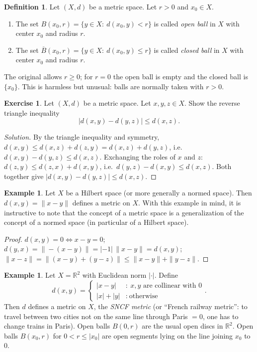 \documentclass[11pt,a4paper]{article}
\numberwithin{equation}{section}
\newcommand{\R}{\mathbb{R}}
\newcommand{\conj}[1]{\overline{#1}}
\theoremstyle{plain}
\theoremstyle{definition}
\newtheorem{definition}[theorem]{Definition}
\newtheorem{example}[theorem]{Example}
\newtheorem{exercise}[theorem]{Exercise}
\theoremstyle{plain}
\theoremstyle{definition}
\newenvironment{solution}{\begin{proof}[Solution]}{\end{proof}}
\begin{document}
\begin{definition}
Let $(X,d)$ be a metric space. Let $r>0$ and $x_0\in X$.
\begin{enumerate}
\item The set $B(x_0,r)=\{y\in X:\ d(x_0,y)<r\}$ is called \emph{open ball} in $X$ with
center $x_0$ and radius $r$.
\item The set $\conj B(x_0,r)=\{y\in X:\ d(x_0,y)\le r\}$ is called \emph{closed ball} in
$X$ with center $x_0$ and radius $r$.
\end{enumerate}
\end{definition}
\begin{correction}[(Def.~7.2)]
The original allows $r\ge0$; for $r=0$ the open ball is empty and the closed ball is
$\{x_0\}$. This is harmless but unusual: balls are normally taken with $r>0$.
\end{correction}

\begin{exercise}
Let $(X,d)$ be a metric space. Let $x,y,z\in X$. Show the reverse triangle inequality
\[
|d(x,y)-d(y,z)|\le d(x,z).
\]
\end{exercise}
\begin{solution}
By the triangle inequality and symmetry, $d(x,y)\le d(x,z)+d(z,y)=d(x,z)+d(y,z)$, i.e.\
$d(x,y)-d(y,z)\le d(x,z)$. Exchanging the roles of $x$ and $z$:
$d(z,y)\le d(z,x)+d(x,y)$, i.e.\ $d(y,z)-d(x,y)\le d(x,z)$. Both together give
$|d(x,y)-d(y,z)|\le d(x,z)$.
\end{solution}

\begin{example}
Let $X$ be a Hilbert space (or more generally a normed space). Then $d(x,y)=\|x-y\|$ defines
a metric on $X$. With this example in mind, it is instructive to note that the concept of a
metric space is a generalization of the concept of a normed space (in particular of a
Hilbert space).
\end{example}
\begin{proof}
$d(x,y)=0\iff x-y=0$; $d(y,x)=\|-(x-y)\|=|-1|\,\|x-y\|=d(x,y)$;
$\|x-z\|=\|(x-y)+(y-z)\|\le\|x-y\|+\|y-z\|$.
\end{proof}

\begin{example}\label{ex:sncf}
Let $X=\R^2$ with Euclidean norm $|\cdot|$. Define
\[
d(x,y)=\begin{cases}|x-y|&:\ x,y \text{ are collinear with } 0\\ |x|+|y|&:\ \text{otherwise}\end{cases}.
\]
Then $d$ defines a metric on $X$, the \emph{SNCF metric} (or ``French railway metric'':
to travel between two cities not on the same line through Paris $=0$, one has to change
trains in Paris). Open balls $B(0,r)$ are the usual open discs in $\R^2$. Open balls
$B(x_0,r)$ for $0<r\le|x_0|$ are open segments lying on the line joining $x_0$ to $0$.
\end{example}
\end{document}
